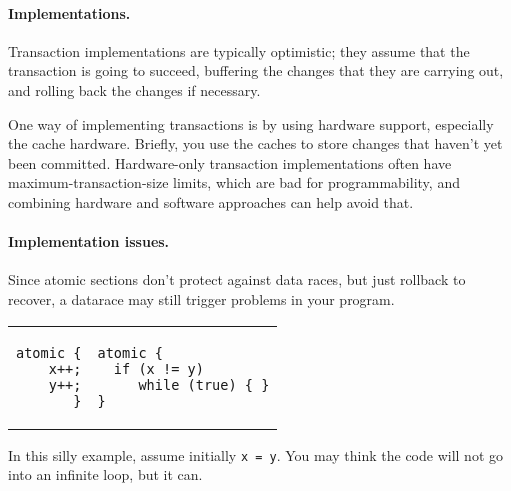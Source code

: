 \paragraph{Implementations.} Transaction implementations are typically 
optimistic; they assume that the transaction is going to succeed,
buffering the changes that they are carrying out, and rolling back the
changes if necessary.

One way of implementing transactions is by using hardware support,
especially the cache hardware. Briefly, you use the caches to store
changes that haven't yet been committed. Hardware-only transaction
implementations often have maximum-transaction-size limits, which are
bad for programmability, and combining hardware and software approaches
can help avoid that.

\paragraph{Implementation issues.} Since atomic sections don't protect
against data races, but just rollback to recover, a datarace may still
trigger problems in your program.

\begin{tabular}{r|l}
\hspace*{2em}  \begin{minipage}{.4\textwidth}
\begin{lstlisting}
atomic {
  x++;
  y++;
}
\end{lstlisting}
\end{minipage}
&
\hspace*{2em} \begin{minipage}{.4\textwidth}
\begin{lstlisting}
atomic {
  if (x != y)
     while (true) { }
}
\end{lstlisting}
\end{minipage}
\end{tabular}

In this silly example, assume initially {\tt x = y}. You may think the
code will not go into an infinite loop, but it can.





